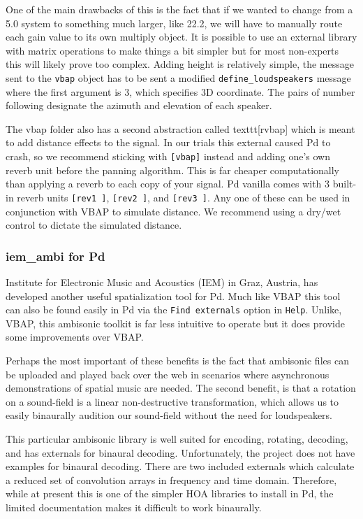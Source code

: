 One of the main drawbacks of this is the fact that if we wanted to change from a 5.0 system to something much larger, like 22.2, we will have to manually route each gain value to its own multiply object. It is possible to use an external library with matrix operations to make things a bit simpler but for most non-experts this will likely prove too complex. Adding height is relatively simple, the message sent to the \texttt{vbap} object has to be sent a modified \texttt{define\_loudspeakers} message where the first argument is 3, which specifies 3D coordinate. The pairs of number following designate the azimuth and elevation of each speaker. 

The vbap folder also has a second abstraction called texttt{[rvbap]} which is meant to add distance effects to the signal. In our trials this external caused Pd to crash, so we recommend sticking with \texttt{[vbap]} instead and adding one's own reverb unit before the panning algorithm. This is far cheaper computationally than applying a reverb to each copy of your signal. Pd vanilla comes with 3 built-in reverb units \texttt{[rev1~]}, \texttt{[rev2~]}, and \texttt{[rev3~]}. Any one of these can be used in conjunction with VBAP to simulate distance. We recommend using a dry/wet control to dictate the simulated distance. 

\subsubsection{iem\_ambi for Pd}

Institute for Electronic Music and Acoustics (IEM) in Graz, Austria, has developed another useful spatialization tool for Pd. Much like VBAP this tool can also be found easily in Pd via the \texttt{Find externals} option in \texttt{Help}. Unlike, VBAP, this ambisonic toolkit is far less intuitive to operate but it does provide some improvements over VBAP. 

Perhaps the most important of these benefits is the fact that ambisonic files can be uploaded and played back over the web in scenarios where asynchronous demonstrations of spatial music are needed. The second benefit, is that a rotation on a sound-field is a linear non-destructive transformation, which allows us to easily binaurally audition our sound-field without the need for loudspeakers. 

This particular ambisonic library is well suited for encoding, rotating, decoding, and has externals for binaural decoding. Unfortunately, the project does not have examples for binaural decoding. There are two included externals which calculate a reduced set of convolution arrays in frequency and time domain. Therefore, while at present this is one of the simpler HOA libraries to install in Pd, the limited documentation makes it difficult to work binaurally. 

